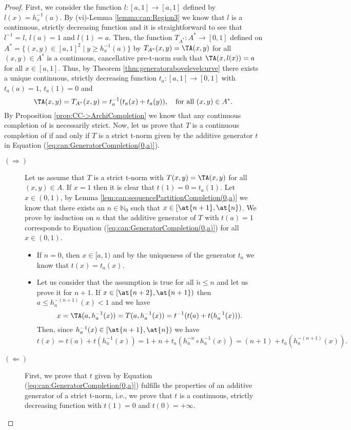 \begin{proof}
	First, we consider the function $l : [a,1] \to [a,1]$ defined by $l(x)=h_x^{-1}(a)$. By (vi)-Lemma \ref{lemma:can:Region3} we know that $l$ is a continuous, strictly decreasing function and it is straightforward to see that $l^{-1}=l$, $l(a)=1$ and $l(1)=a$. Then, the function $T_{A^*}: A^* \to [0,1]$ defined on $A^*=\{(x,y) \in [a,1]^2 \mid y \geq h_x^{-1}(a)\}$ by $T_{A^*}(x,y)=\TA(x,y)$ for all $(x,y) \in A^*$ is a continuous, cancellative pre-t-norm such that $\TA(x,l(x))=a$ for all $x \in [a,1]$. Thus, by Theorem \ref{thm:generatorabovelevelcurve} there exists a unique continuous, strictly decreasing function $t_a : [a,1] \to [0,1]$ with $t_a(a)=1$, $t_a(1)=0$ and 
	$$\TA(x,y) = T_{A^*}(x,y)=t_a^{-1}(t_a(x)+t_a(y)), \quad  \text{for all } (x,y) \in A^*.$$
	By Proposition \ref{prop:CC->ArchiCompletion} we know that any continuous completion of \TA is necessarily strict. Now, let us prove that $T$ is a continuous completion of \TA if and only if $T$ is a strict t-norm given by the additive generator $t$ in Equation (\ref{eq:can:GeneratorCompletion(0,a)}).
	\begin{description}
		\item[$(\Rightarrow)$] Let us assume that $T$ is a strict t-norm with $T(x,y)=\TA(x,y)$ for all $(x,y) \in A$.  If $x=1$ then it is clear that $t(1)=0=t_a(1)$. Let $x \in (0,1)$, by Lemma \ref{lem:can:sequencePartitionCompletion(0,a)} we know that there exists an $n \in \mathbb{N}_0$ such that $x \in [\at{n+1},\at{n})$. We prove by induction on $n$ that the additive generator of $T$ with $t(a)=1$ corresponds to Equation (\ref{eq:can:GeneratorCompletion(0,a)}) for all $x \in (0,1)$.
		\begin{itemize}
			\item If $n=0$, then $x \in [a,1)$ and by the uniqueness of the generator $t_a$ we know that $t(x)=t_a(x)$.
			\item Let us consider that the assumption is true for all $\tilde{n} \leq n$ and let us prove it for $n+1$. If $ x \in [\at{n+2},\at{n+1})$ then $a \leq h_a^{-(n+1)}(x)<1$ and we have
			$$x=\TA(a,h_a^{-1}(x)) = T(a,h_a^{-1}(x))=t^{-1}(t(a)+t(h_a^{-1}(x))).$$
			Then, since $h_a^{-1}(x) \in [\at{n+1},\at{n})$ we have
			$$t(x)=t(a)+t(h_a^{-1}(x))=1+n+t_a(h_a^{-n} \circ h_a^{-1}(x))=(n+1)+t_a(h_a^{-(n+1)}(x)).$$
		\end{itemize}
		\item[$(\Leftarrow)$] First, we prove that $t$ given by Equation (\ref{eq:can:GeneratorCompletion(0,a)}) fulfills the properties of an additive generator of a strict t-norm, i.e., we prove that $t$ is a continuous, strictly decreasing function with $t(1)=0$ and $t(0)=+\infty$.

\end{description}
\end{proof}
